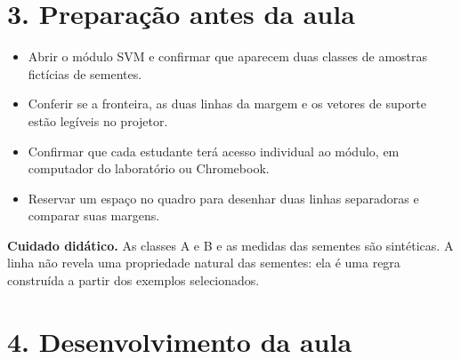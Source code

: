 \documentclass[12pt,a4paper]{article}
\newcommand{\bloco}[1]{%
  \vspace{0.25em}
  \noindent\colorbox{cinza}{\parbox{0.96\linewidth}{#1}}%
  \vspace{0.3em}
}
\begin{document}
\section*{3. Preparação antes da aula}

\begin{itemize}
  \item Abrir o módulo SVM e confirmar que aparecem duas classes de amostras fictícias de sementes.
  \item Conferir se a fronteira, as duas linhas da margem e os vetores de suporte estão legíveis no projetor.
  \item Confirmar que cada estudante terá acesso individual ao módulo, em computador do laboratório ou Chromebook.
  \item Reservar um espaço no quadro para desenhar duas linhas separadoras e comparar suas margens.
\end{itemize}

\bloco{\textbf{Cuidado didático.} As classes A e B e as medidas das sementes são sintéticas. A linha não revela uma propriedade natural das sementes: ela é uma regra construída a partir dos exemplos selecionados.}

\section*{4. Desenvolvimento da aula}
\end{document}
